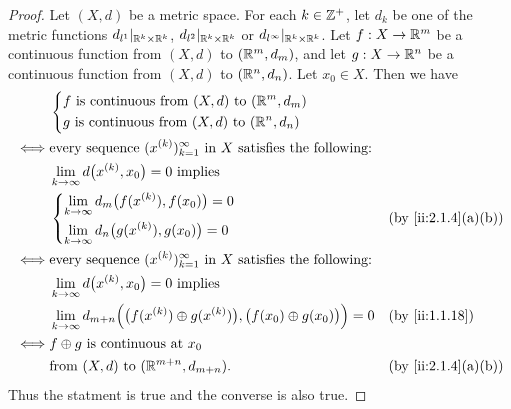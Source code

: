 \begin{proof}
  Let \((X, d)\) be a metric space.
  For each \(k \in \mathbb{Z}^+\), let \(d_k\) be one of the metric functions \(d_{l^1}|_{\mathbb{R}^k \times \mathbb{R}^k}\), \(d_{l^2}|_{\mathbb{R}^k \times \mathbb{R}^k}\) or \(d_{l^\infty}|_{\mathbb{R}^k \times \mathbb{R}^k}\).
  Let \(f : X \to \mathbb{R}^m\) be a continuous function from \((X, d)\) to \((\mathbb{R}^m, d_m)\), and let \(g : X \to \mathbb{R}^n\) be a continuous function from \((X, d)\) to \((\mathbb{R}^n, d_n)\).
  Let \(x_0 \in X\).
  Then we have
  \begin{align*}
         & \begin{dcases}
             f \text{ is continuous from } (X, d) \text{ to } (\R^m, d_m) \\
             g \text{ is continuous from } (X, d) \text{ to } (\R^n, d_n)
           \end{dcases}                                                                           \\
    \iff & \text{every sequence } (x^{(k)})_{k = 1}^\infty \text{ in } X \text{ satisfies the following:}                                         \\
         & \lim_{k \to \infty} d\big(x^{(k)}, x_0\big) = 0 \text{ implies }                                                                       \\
         & \begin{dcases}
             \lim_{k \to \infty} d_m\big(f(x^{(k)}), f(x_0)\big) = 0 \\
             \lim_{k \to \infty} d_n\big(g(x^{(k)}), g(x_0)\big) = 0
           \end{dcases}                                                        &  & \by{ii:2.1.4}[a,b]                                               \\
    \iff & \text{every sequence } (x^{(k)})_{k = 1}^\infty \text{ in } X \text{ satisfies the following:}                                         \\
         & \lim_{k \to \infty} d\big(x^{(k)}, x_0\big) = 0 \text{ implies }                                                                       \\
         & \lim_{k \to \infty} d_{m + n}\Big(\big(f(x^{(k)}) \oplus g(x^{(k)})\big), \big(f(x_0) \oplus g(x_0)\big)\Big) = 0 &  & \by{ii:1.1.18}     \\
    \iff & f \oplus g \text{ is continuous at } x_0                                                                                               \\
         & \text{from } (X, d) \text{ to } (\R^{m + n}, d_{m + n}).                                                          &  & \by{ii:2.1.4}[a,b]
  \end{align*}
  Thus the statment is true and the converse is also true.
\end{proof}

